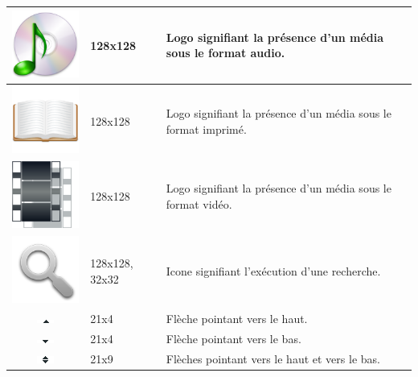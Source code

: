 \documentclass[letter, 11pt]{report}
\begin{document}
\begin{table}[ht]
\begin{center}
\begin{tabular}{|c|l|l|}
		\includegraphics[scale=0.3]{audio.png}           & 128x128          & Logo signifiant la présence d'un média sous le format audio. \\ \hline
		\includegraphics[scale=0.3]{imprime.png}         & 128x128          & Logo signifiant la présence d'un média sous le format imprimé. \\ \hline
		\includegraphics[scale=0.3]{video.png}           & 128x128          & Logo signifiant la présence d'un média sous le format vidéo. \\ \hline
		\includegraphics[scale=0.3]{search.png}          & 128x128, 32x32   & Icone signifiant l'exécution d'une recherche. \\ \hline
		\includegraphics{down.png}                       & 21x4             & Flèche pointant vers le haut. \\ \hline
		\includegraphics{up.png}                         & 21x4             & Flèche pointant vers le bas. \\ \hline
		\includegraphics{upAndDown.png}                  & 21x9             & Flèches pointant vers le haut et vers le bas. \\ \hline
		\end{tabular}
	\end{center}
\end{table}
\end{document}
